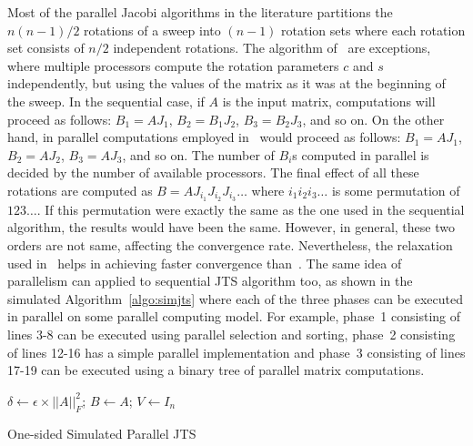 \documentclass[10pt, conference, compsocconf]{IEEEtran}
\begin{document}
Most of the parallel Jacobi algorithms in the literature partitions the $n(n-1)/2$ rotations of a sweep into $(n-1)$ rotation sets where each rotation set consists of $n/2$ independent rotations. The algorithm of~\cite{strumpen2003stream, rajasekaran2008relaxation} are exceptions, where multiple processors compute the rotation parameters $c$ and $s$ independently, but using the values of the matrix as it was at the beginning of the sweep. In the sequential case, if $A$ is the input matrix, computations will proceed as follows: $B_1 = A J_1$, $B_2 = B_1 J_2$, $B_3 = B_2 J_3$, and so on. On the other hand, in parallel computations employed in~\cite{strumpen2003stream, rajasekaran2008relaxation} would proceed as follows: $B_1 = A J_1$, $B_2 = A J_2$, $B_3 = A J_3$, and so on. The number of $B_i$s computed in parallel is decided by the number of available processors. The final effect of all these rotations are computed as $B = A J_{i_1} J_{i_2} J_{i_3} \ldots$ where $i_1i_2i_3\ldots$ is some permutation of $123\ldots$. If this permutation were exactly the same as the one used in the sequential algorithm, the results would have been the same. However, in general, these two orders are not same, affecting the convergence rate. Nevertheless, the relaxation used in~\cite{rajasekaran2008relaxation} helps in achieving faster convergence than~\cite{strumpen2003stream}. The same idea of parallelism can applied to sequential JTS algorithm too, as shown in the simulated Algorithm~\ref{algo:simjts} where each of the three phases can be executed in parallel on some parallel computing model. For example, phase~1 consisting of lines 3-8 can be executed using parallel selection and sorting, phase~2 consisting of lines 12-16 has a simple parallel implementation and phase~3 consisting of lines 17-19 can be executed using a binary tree of parallel matrix computations.

\begin{algorithm}
$\delta \gets \epsilon \times ||A||^2_F$; \quad $B \gets A$; \quad $V \gets I_n$\;
\caption{One-sided Simulated Parallel JTS}
\label{algo:simjts}
\end{algorithm}
\end{document}
